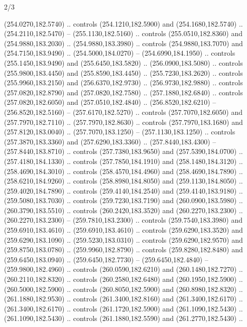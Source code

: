 \begin{flagdescription}{2/3}
\begin{scope}[xshift=0.5\flaglength,yshift=0.5\flagwidth,scale=\flagwidth/259.2]
\begin{scope}[y=0.8pt, x=0.8pt, yscale=-1,shift={(-243,-162)}]
      (254.0270,182.5740) .. controls (254.1210,182.5900) and (254.1680,182.5740) ..
      (254.2110,182.5470) -- (255.1130,182.5160) .. controls (255.0510,182.8360) and
      (254.9880,183.2030) .. (254.9880,183.3980) .. controls (254.9880,183.7070) and
      (254.7150,183.9490) .. (254.5000,184.0270) -- (254.6990,184.1950) .. controls
      (255.1450,183.9490) and (255.6450,183.5820) .. (256.0900,183.5080) .. controls
      (255.9800,183.4450) and (255.8590,183.4450) .. (255.7230,183.2620) .. controls
      (255.9960,183.2150) and (256.6370,182.9730) .. (256.9730,182.9880) .. controls
      (257.0820,182.8790) and (257.0820,182.7580) .. (257.1880,182.6840) .. controls
      (257.0820,182.6050) and (257.0510,182.4840) .. (256.8520,182.6210) --
      (256.8520,182.5160) -- (257.6170,182.5270) .. controls (257.7070,182.6050) and
      (257.7970,182.7110) .. (257.7970,182.8630) .. controls (257.7970,183.1680) and
      (257.8120,183.0040) .. (257.7070,183.1250) -- (257.1130,183.1250) .. controls
      (257.3870,183.3360) and (257.6290,183.3360) .. (257.8440,183.4300) --
      (257.8440,183.8710) .. controls (257.7380,183.9650) and (257.5390,184.0700) ..
      (257.4180,184.1330) .. controls (257.7850,184.1910) and (258.1480,184.3120) ..
      (258.4690,184.3010) .. controls (258.4570,184.4960) and (258.4690,184.7890) ..
      (258.6210,184.9260) .. controls (258.8980,184.8050) and (259.1130,184.8050) ..
      (259.4020,184.7890) .. controls (259.4140,184.2540) and (259.4140,183.9180) ..
      (259.5080,183.7030) .. controls (259.7230,183.7190) and (260.0900,183.5980) ..
      (260.3790,183.5510) .. controls (260.2420,183.3520) and (260.2270,183.2300) ..
      (260.2270,183.2300) -- (259.7810,183.2300) .. controls (259.7540,183.3980) and
      (259.6910,183.4610) .. (259.6910,183.4610) .. controls (259.6290,183.3520) and
      (259.6290,183.1090) .. (259.5230,183.0310) .. controls (259.6290,182.9570) and
      (259.8750,183.0780) .. (259.9960,182.8790) .. controls (259.8280,182.8480) and
      (259.6450,183.0940) .. (259.6450,182.7730) -- (259.6450,182.4840) --
      (259.9800,182.4960) .. controls (260.0590,182.6210) and (260.1480,182.7270) ..
      (260.2110,182.8320) .. controls (260.2580,182.6480) and (260.1950,182.5900) ..
      (260.5000,182.5900) .. controls (260.8050,182.5900) and (260.8980,182.8320) ..
      (261.1880,182.9530) .. controls (261.3400,182.8160) and (261.3400,182.6170) ..
      (261.3400,182.6170) .. controls (261.1720,182.5900) and (261.1090,182.5430) ..
      (261.1090,182.5430) .. controls (261.1880,182.5590) and (261.2770,182.5430) ..

\end{scope}
\end{scope}
\end{flagdescription}
